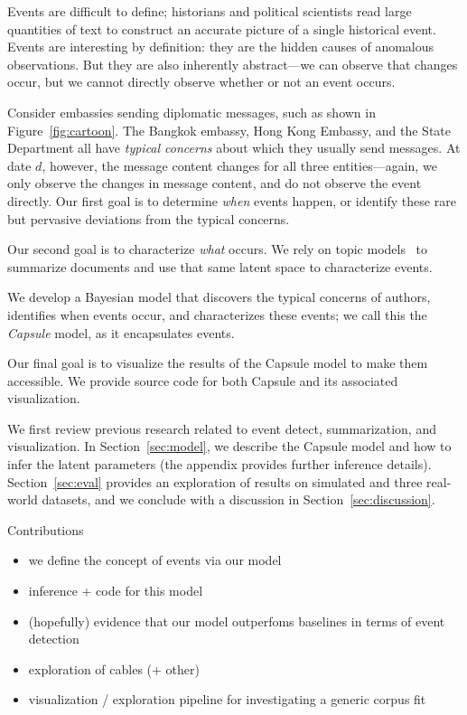 
Events are difficult to define; historians and political scientists read large quantities of text to construct an accurate picture of a single historical event.  Events are interesting by definition: they are the hidden causes of anomalous observations.  But they are also inherently abstract---we can observe that changes occur, but we cannot directly observe whether or not an event occurs.

Consider embassies sending diplomatic messages, such as shown in Figure~\ref{fig:cartoon}.  The Bangkok embassy, Hong Kong Embassy, and the State Department all have \emph{typical concerns} about which they usually send messages.  At date $d$, however, the message content changes for all three entities---again, we only observe the changes in message content, and do not observe the event directly.  Our first goal is to determine \emph{when} events happen, or identify these rare but pervasive deviations from the typical concerns.

Our second goal is to characterize \emph{what} occurs.  We rely on topic models~\cite{Blei:2012} to summarize documents and use that same latent space to characterize events.

We develop a Bayesian model that discovers the typical concerns of authors, identifies when events occur, and characterizes these events; we call this the \emph{Capsule} model, as it encapsulates events.

Our final goal is to visualize the results of the Capsule model to make them accessible.   We provide source code for both Capsule and its associated visualization.

We first review previous research related to event detect, summarization, and visualization.  In Section~\ref{sec:model}, we describe the Capsule model and how to infer the latent parameters (the appendix provides further inference details).  Section~\ref{sec:eval} provides an exploration of results on simulated and three real-world datasets, and we conclude with a discussion in Section~\ref{sec:discussion}.

Contributions
\begin{itemize}
\item we define the concept of events via our model
\item inference + code for this model
\item (hopefully) evidence that our model outperfoms baselines in terms of event detection
\item exploration of cables (+ other)
\item visualization / exploration pipeline for investigating a generic corpus fit
\end{itemize}


